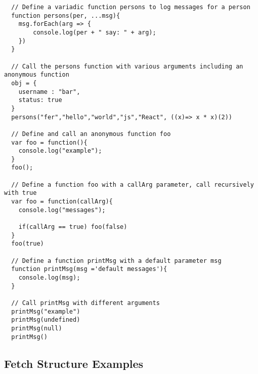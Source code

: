 \documentclass[12pt,a4paper, twosite]{article}
\begin{document}
\begin{verbatim}
  // Define a variadic function persons to log messages for a person
  function persons(per, ...msg){
    msg.forEach(arg => {
        console.log(per + " say: " + arg);
    })
  }

  // Call the persons function with various arguments including an anonymous function
  obj = {
    username : "bar",
    status: true
  }
  persons("fer","hello","world","js","React", ((x)=> x * x)(2))

  // Define and call an anonymous function foo
  var foo = function(){
    console.log("example");    
  }
  foo();

  // Define a function foo with a callArg parameter, call recursively with true
  var foo = function(callArg){
    console.log("messages");

    if(callArg == true) foo(false)
  }
  foo(true)

  // Define a function printMsg with a default parameter msg
  function printMsg(msg ='default messages'){
    console.log(msg);
  }

  // Call printMsg with different arguments
  printMsg("example")
  printMsg(undefined)
  printMsg(null)
  printMsg()
\end{verbatim}

\newpage

\subsection{Fetch Structure Examples}
\end{document}
